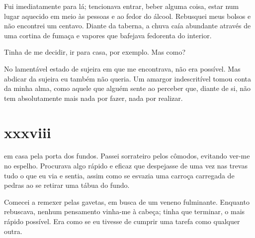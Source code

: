 Fui imediatamente para lá; tencionava entrar, beber alguma coisa, estar num
lugar aquecido em meio às pessoas e ao fedor do álcool. Rebusquei meus bolsos
e não encontrei um centavo. Diante da taberna, a chuva caía abundante através
de uma cortina de fumaça e vapores que bafejava fedorenta do interior.

Tinha de me decidir, ir para casa, por exemplo. Mas como?

No lamentável estado de sujeira em que me encontrava, não era possível. Mas
abdicar da sujeira eu também não queria. Um amargor indescritível tomou conta
da minha alma, como aquele que alguém sente ao perceber que, diante de si,
não tem absolutamente mais nada por fazer, nada por realizar.



\section{xxxviii} 

 em casa pela porta dos fundos. Passei sorrateiro pelos
 cômodos, evitando ver-me no espelho. Procurava algo rápido e eficaz que
 despejasse de uma vez nas trevas tudo o que eu via e sentia, assim como se
 esvazia uma carroça carregada de pedras ao se retirar uma tábua do fundo.

Comecei a remexer pelas gavetas, em busca de um veneno fulminante. Enquanto
rebuscava, nenhum pensamento vinha-me à cabeça; tinha que terminar, o mais
rápido possível. Era como se eu tivesse de cumprir uma tarefa como qualquer
outra. 



